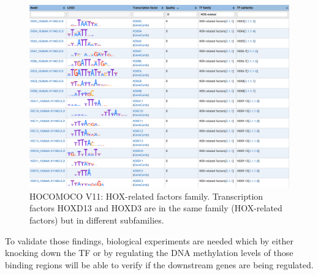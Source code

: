 \begin{center}
\begin{figure}[h!]
\includegraphics[width=16cm]{images/HOCOMOCO.png}
\caption[HOCOMOCO: HOX-related factors family]{HOCOMOCO V11: HOX-related factors family. Transcription factors HOXD13 and HOXD3 are in the same family (HOX-related factors) but in different subfamilies.}
\end{figure}
\label{tab:hocomoco}
\end{center}

To validate those findings, biological experiments are needed which by either knocking down the TF or by regulating the DNA methylation levels of those binding regions will be able to verify if the downstream genes are being regulated.


